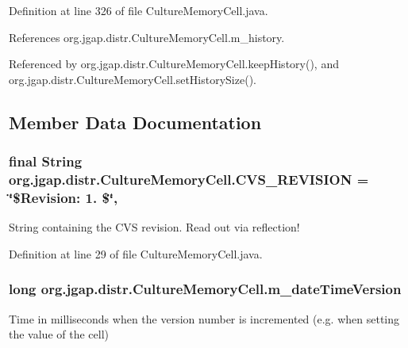 Definition at line 326 of file Culture\-Memory\-Cell.\-java.



References org.\-jgap.\-distr.\-Culture\-Memory\-Cell.\-m\-\_\-history.



Referenced by org.\-jgap.\-distr.\-Culture\-Memory\-Cell.\-keep\-History(), and org.\-jgap.\-distr.\-Culture\-Memory\-Cell.\-set\-History\-Size().



\subsection{Member Data Documentation}
\hypertarget{classorg_1_1jgap_1_1distr_1_1_culture_memory_cell_ab067ea6a1cf3e0d5f342ffa97a6576e9}{
\subsubsection[{C\-V\-S\-\_\-\-R\-E\-V\-I\-S\-I\-O\-N}]{\setlength{\rightskip}{0pt plus 5cm}final String org.\-jgap.\-distr.\-Culture\-Memory\-Cell.\-C\-V\-S\-\_\-\-R\-E\-V\-I\-S\-I\-O\-N = \char`\"{}\$Revision\-: 1. \$\char`\"{}\hspace{0.3cm}{\ttfamily [static]}, {\ttfamily [private]}}}\label{classorg_1_1jgap_1_1distr_1_1_culture_memory_cell_ab067ea6a1cf3e0d5f342ffa97a6576e9}
String containing the C\-V\-S revision. Read out via reflection! 

Definition at line 29 of file Culture\-Memory\-Cell.\-java.

\hypertarget{classorg_1_1jgap_1_1distr_1_1_culture_memory_cell_a26c0995799dbebc65f605a5b68cb8083}{
\subsubsection[{m\-\_\-date\-Time\-Version}]{\setlength{\rightskip}{0pt plus 5cm}long org.\-jgap.\-distr.\-Culture\-Memory\-Cell.\-m\-\_\-date\-Time\-Version\hspace{0.3cm}{\ttfamily [private]}}}\label{classorg_1_1jgap_1_1distr_1_1_culture_memory_cell_a26c0995799dbebc65f605a5b68cb8083}
Time in milliseconds when the version number is incremented (e.\-g. when setting the value of the cell) 

